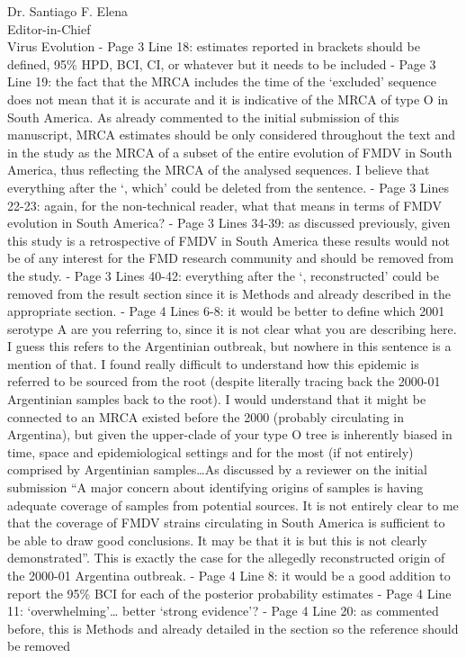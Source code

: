 \documentclass[12pt, a4paper]{letter} %
\begin{document}
\begin{letter}{
	Dr. Santiago F. Elena\\
    Editor-in-Chief \\
    Virus Evolution
}
-       Page 3 Line 18: estimates reported in brackets should be defined, 95\% HPD, BCI, CI, or whatever but it needs to be included
-       Page 3 Line 19: the fact that the MRCA includes the time of the ‘excluded’ sequence does not mean that it is accurate and it is indicative of the MRCA of type O in South America. As already commented to the initial submission of this manuscript, MRCA estimates should be only considered throughout the text and in the study as the MRCA of a subset of the entire evolution of FMDV in South America, thus reflecting the MRCA of the analysed sequences. I believe that everything after the ‘, which’ could be deleted from the sentence.
-       Page 3 Lines 22-23: again, for the non-technical reader, what that means in terms of FMDV evolution in South America?
-       Page 3 Lines 34-39: as discussed previously, given this study is a retrospective of FMDV in South America these results would not be of any interest for the FMD research community and should be removed from the study.
-       Page 3 Lines 40-42: everything after the ‘, reconstructed’ could be removed from the result section since it is Methods and already described in the appropriate section.
-       Page 4 Lines 6-8: it would be better to define which 2001 serotype A are you referring to, since it is not clear what you are describing here. I guess this refers to the Argentinian outbreak, but nowhere in this sentence is a mention of that. I found really difficult to understand how this epidemic is referred to be sourced from the root (despite literally tracing back the 2000-01 Argentinian samples back to the root). I would understand that it might be connected to an MRCA existed before the 2000 (probably circulating in Argentina), but given the upper-clade of your type O tree is inherently biased in time, space and epidemiological settings and for the most (if not entirely) comprised by Argentinian samples…As discussed by a reviewer on the initial submission “A major concern about identifying origins of samples is having adequate coverage of samples from potential sources. It is not entirely clear to me that the coverage of FMDV strains circulating in South America is sufficient to be able to draw good conclusions. It may be that it is but this is not clearly demonstrated”. This is exactly the case for the allegedly reconstructed origin of the 2000-01 Argentina outbreak.
-       Page 4 Line 8: it would be a good addition to report the 95\% BCI for each of the posterior probability estimates
-       Page 4 Line 11: ‘overwhelming’… better ‘strong evidence’?
-       Page 4 Line 20: as commented before, this is Methods and already detailed in the section so the reference should be removed

\end{letter}
\end{document}
